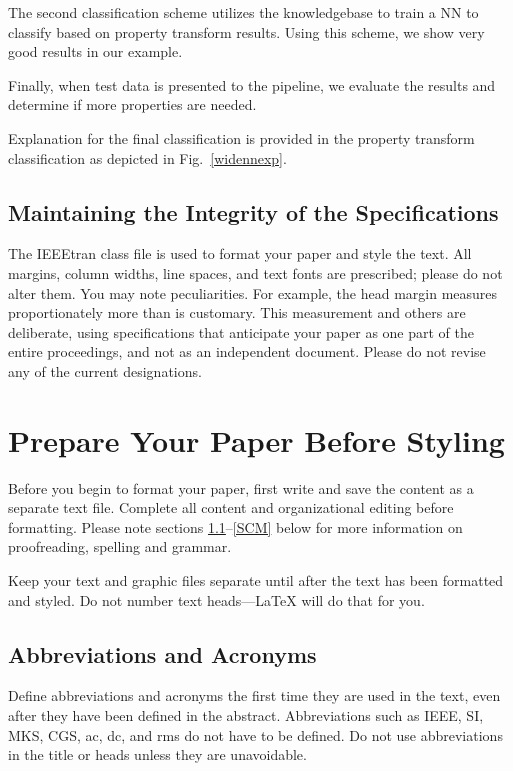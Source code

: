 \documentclass[conference]{IEEEtran}
\begin{document}
The second classification scheme utilizes the knowledgebase to train a NN to classify based on property transform results.  Using this scheme, we show very good results in our example.

Finally, when test data is presented to the pipeline, we evaluate the results and determine if more properties are needed.

Explanation for the final classification is provided in the property transform classification as depicted in Fig.~\ref{widennexp}.
 

\subsection{Maintaining the Integrity of the Specifications}

The IEEEtran class file is used to format your paper and style the text. All margins, 
column widths, line spaces, and text fonts are prescribed; please do not 
alter them. You may note peculiarities. For example, the head margin
measures proportionately more than is customary. This measurement 
and others are deliberate, using specifications that anticipate your paper 
as one part of the entire proceedings, and not as an independent document. 
Please do not revise any of the current designations.

\section{Prepare Your Paper Before Styling}
Before you begin to format your paper, first write and save the content as a 
separate text file. Complete all content and organizational editing before 
formatting. Please note sections \ref{AA}--\ref{SCM} below for more information on 
proofreading, spelling and grammar.

Keep your text and graphic files separate until after the text has been 
formatted and styled. Do not number text heads---{\LaTeX} will do that 
for you.

\subsection{Abbreviations and Acronyms}\label{AA}
Define abbreviations and acronyms the first time they are used in the text, 
even after they have been defined in the abstract. Abbreviations such as 
IEEE, SI, MKS, CGS, ac, dc, and rms do not have to be defined. Do not use 
abbreviations in the title or heads unless they are unavoidable.
\end{document}
